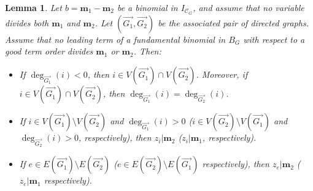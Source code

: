 \documentclass[11pt]{article}
\newtheorem{lemm}[theo]{Lemma}
\theoremstyle{definition}
\numberwithin{equation}{section}
\begin{document}
\begin{lemm}\label{lem: technical}
    Let $b = \mathbf{m}_1 - \mathbf{m}_2$ be a binomial in $I_{\mathcal{C}_G}$, and assume that no variable divides both $\mathbf{m}_1$ and $\mathbf{m}_2$. Let $(\overrightarrow{G_1},\overrightarrow{G_2})$ be the associated pair of directed graphs. Assume that no leading term of a fundamental binomial in $B_G$ with respect to a good term order divides $\mathbf{m}_1$ or $\mathbf{m}_2$.
    Then:
    \begin{itemize}
        \item[(1)] If $\deg_{\overrightarrow{G_1}}(i)<0$, then $i\in V(\overrightarrow{G_1})\cap V(\overrightarrow{G_2})$.  Moreover, if $i\in V(\overrightarrow{G_1})\cap V(\overrightarrow{G_2})$, then $\deg_{\overrightarrow{G_1}}(i)= \deg_{\overrightarrow{G_2}}(i)$. 
        \item[(2)] If $i\in V(\overrightarrow{G_1})\setminus V(\overrightarrow{G_2})$ and $\deg_{\overrightarrow{G_1}}(i)>0$ ($i\in V(\overrightarrow{G_2})\setminus V(\overrightarrow{G_1})$ and $\deg_{\overrightarrow{G_2}}(i)>0 $, respectively), then $z_i| \mathbf{m}_2$ ($z_i| \mathbf{m}_1$, respectively).
       \item[(3)]  If $e\in E(\overrightarrow{G_1})\setminus E(\overrightarrow{G_2})$ ($e\in E(\overrightarrow{G_2})\setminus E(\overrightarrow{G_1})$ respectively), then $z_e|\mathbf{m}_2$ ($z_e|\mathbf{m}_1$ respectively).    \end{itemize}
\end{lemm}
\end{document}
